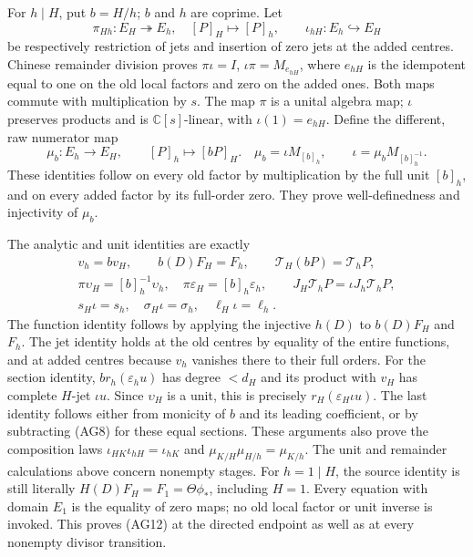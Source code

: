 For $h\mid H$, put $b=H/h$; $b$ and $h$ are coprime.  Let
\[
 \pi_{Hh}:E_H\twoheadrightarrow E_h,\quad[P]_H\mapsto[P]_h,
 \qquad
 \iota_{hH}:E_h\hookrightarrow E_H
 \tag{AG10}
\]
be respectively restriction of jets and insertion of zero jets at
the added centres.  Chinese remainder division proves
$\pi\iota=I$, $\iota\pi=M_{e_{hH}}$, where $e_{hH}$ is the
idempotent equal to one on the old local factors and zero on the
added ones.  Both maps commute with multiplication by $s$.
The map $\pi$ is a unital algebra map; $\iota$ preserves products
and is $\mathbb C[s]$-linear, with $\iota(1)=e_{hH}$.
Define the different, raw numerator map
\[
 \mu_b:E_h\to E_H,\qquad[P]_h\mapsto[bP]_H.
 \quad
 \mu_b=\iota M_{[b]_h},\qquad
 \iota=\mu_b M_{[b]_h^{-1}}.
 \tag{AG11}
\]
These identities follow on every old factor by multiplication by
the full unit $[b]_h$, and on every added factor by its full-order
zero.  They prove well-definedness and injectivity of $\mu_b$.

The analytic and unit identities are exactly
\[
 \begin{gathered}
 v_h=bv_H,\qquad b(D)F_H=F_h,\qquad
 \mathcal T_H(bP)=\mathcal T_hP,\\
 \pi\upsilon_H=[b]_h^{-1}\upsilon_h,
 \quad\pi\varepsilon_H=[b]_h\varepsilon_h,\qquad
 J_H\mathcal T_hP=\iota J_h\mathcal T_hP,\\
 s_H\iota=s_h,\quad\sigma_H\iota=\sigma_h,
 \quad\ell_H\iota=\ell_h.
 \end{gathered}\tag{AG12}
\]
The function identity follows by applying the injective $h(D)$
to $b(D)F_H$ and $F_h$.  The jet identity holds at the old centres
by equality of the entire functions, and at added centres because
$v_h$ vanishes there to their full orders.  For the section identity,
$b r_h(\varepsilon_hu)$ has degree $<d_H$ and its product with
$v_H$ has complete $H$-jet $\iota u$.  Since $\upsilon_H$
is a unit, this is precisely $r_H(\varepsilon_H\iota u)$.
The last identity follows either from monicity of $b$ and its
leading coefficient, or by subtracting (AG8) for these equal
sections.  These arguments also prove the composition laws
$\iota_{HK}\iota_{hH}=\iota_{hK}$ and
$\mu_{K/H}\mu_{H/h}=\mu_{K/h}$.
The unit and remainder calculations above concern nonempty stages.
For $h=1\mid H$, the source identity is still literally
$H(D)F_H=F_1=\Theta\phi_*$, including $H=1$. Every equation with
domain $E_1$ is the equality of zero maps; no old local factor or
unit inverse is invoked. This proves (AG12) at the directed endpoint
as well as at every nonempty divisor transition.

